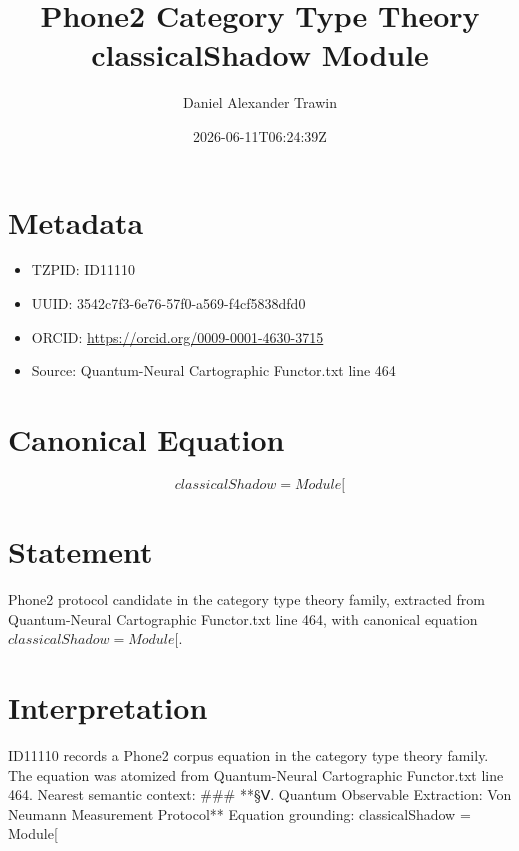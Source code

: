 \documentclass[11pt]{article}
\title{Phone2 Category Type Theory classicalShadow Module}
\author{Daniel Alexander Trawin}
\date{2026-06-11T06:24:39Z}
\begin{document}
\maketitle
\section*{Metadata}
\begin{itemize}
\item TZPID: ID11110
\item UUID: 3542c7f3-6e76-57f0-a569-f4cf5838dfd0
\item ORCID: \url{https://orcid.org/0009-0001-4630-3715}
\item Source: Quantum-Neural Cartographic Functor.txt line 464
\end{itemize}
\section*{Canonical Equation}
\[
classicalShadow = Module[
\]
\section*{Statement}
Phone2 protocol candidate in the category type theory family, extracted from Quantum-Neural Cartographic Functor.txt line 464, with canonical equation $classicalShadow = Module[$.
\section*{Interpretation}
ID11110 records a Phone2 corpus equation in the category type theory family. The equation was atomized from Quantum-Neural Cartographic Functor.txt line 464. Nearest semantic context: ### **§Ⅴ. Quantum Observable Extraction: Von Neumann Measurement Protocol** Equation grounding: classicalShadow = Module[
\end{document}
